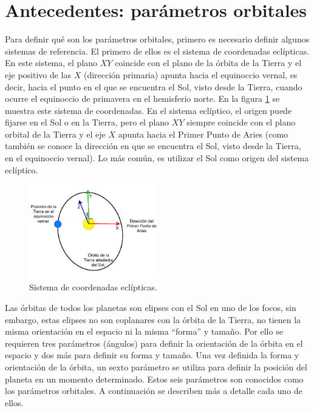 \documentclass[a4paper,10pt]{article}
\begin{document}
\section{Antecedentes: parámetros orbitales}
Para definir qué son los parámetros orbitales, primero es necesario definir algunos sistemas de referencia. El primero de ellos es el sistema de coordenadas eclípticas. En este sistema, el plano $XY$ coincide con el plano de la órbita de la Tierra y el eje positivo de las $X$ (dirección primaria) apunta hacia el equinoccio vernal, es decir, hacia el punto en el que se encuentra el Sol, visto desde la Tierra, cuando ocurre el equinoccio de primavera en el hemisferio norte. En la figura \ref{fig:EclipticFrame} se muestra este sistema de coordenadas. En el sistema eclíptico, el origen puede fijarse en el Sol o en la Tierra, pero el plano $XY$ siempre coincide con el plano orbital de la Tierra y el eje $X$ apunta hacia el Primer Punto de Aries (como también se conoce la dirección en que se encuentra el Sol, visto desde la Tierra, en el equinoccio vernal). Lo más común, es utilizar el Sol como origen del sistema eclíptico. 
\begin{figure}
  \centering
  \includegraphics[width=0.5\textwidth]{Figures/EclipticCoordinates.pdf}
  \caption{Sistema de coordenadas eclípticas.}
  \label{fig:EclipticFrame}
\end{figure}

Las órbitas de todos los planetas son elipses con el Sol en uno de los focos, sin embargo, estas elipses no son coplanares con la órbita de la Tierra, no tienen la misma orientación en el espacio ni la misma ``forma'' y tamaño. Por ello se requieren tres parámetros (ángulos) para definir la orientación de la órbita en el espacio y dos más para definir su forma y tamaño. Una vez definida la forma y orientación de la órbita, un sexto parámetro se utiliza para definir la posición del planeta en un momento determinado. Estos seis parámetros son conocidos como los parámetros orbitales. A continuación se describen más a detalle cada uno de ellos.
\end{document}
